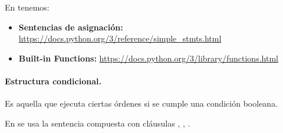 En  tenemos: 
	\begin{itemize}
	\item \textbf{Sentencias de asignación:} {\footnotesize \url{https://docs.python.org/3/reference/simple_stmts.html}}
	\item \textbf{Built-in Functions:} \footnotesize \url{https://docs.python.org/3/library/functions.html}
	\end{itemize}



\paragraph{Estructura condicional.}

Es  aquella que ejecuta ciertas órdenes si se cumple una condición booleana.

En  se usa la sentencia compuesta con cláusulas , , .

